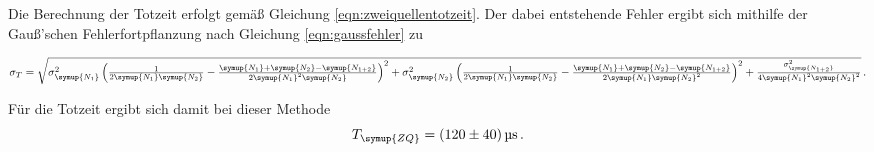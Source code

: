 Die Berechnung der Totzeit erfolgt gemäß Gleichung \eqref{eqn:zweiquellentotzeit}.
Der dabei entstehende Fehler ergibt sich mithilfe der Gauß'schen Fehlerfortpflanzung
nach Gleichung \eqref{eqn:gaussfehler} zu
\begin{center}
  $\sigma_T = \sqrt{\sigma_{\symup{N_1}}^{2} \left(\frac{1}{2 \symup{N_1} \symup{N_2}}
  - \frac{\symup{N_1} + \symup{N_2} - \symup{N_{1+2}}}{2 \symup{N_1}^{2} \symup{N_2}}\right)^{2}
  + \sigma_{\symup{N_2}}^{2} \left(\frac{1}{2 \symup{N_1} \symup{N_2}}
  - \frac{\symup{N_1} + \symup{N_2} - \symup{N_{1+2}}}{2 \symup{N_1} \symup{N_2}^{2}}\right)^{2}
  + \frac{\sigma_{\symup{N_{1+2}}}^{2}}{4 \symup{N_1}^{2} \symup{N_2}^{2}}} \,.$
\end{center}
Für die Totzeit ergibt sich damit bei dieser Methode
\begin{equation*}
  T_{\symup{ZQ}}= (120 \pm 40)\,\text{µs} \,.
\end{equation*}
